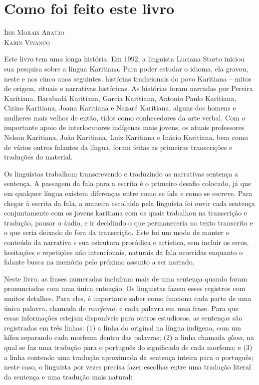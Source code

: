 \chapter{Como foi feito este livro}

\begin{flushright}
\textsc{Íris Morais Araújo}\\
\textsc{Karin Vivanco}
\end{flushright}

\noindent{}Este livro tem uma longa história. Em 1992, a linguista Luciana Storto
iniciou sua pesquisa sobre a língua Karitiana. Para poder estudar o
idioma, ela gravou, neste e nos cinco anos seguintes, histórias
tradicionais do povo Karitiana -- mitos de origem, rituais e narrativas
históricas. As histórias foram narradas por Pereira Karitiana, Barabadá
Karitiana, Garcia Karitiana, Antonio Paulo Karitiana, Cizino Karitiana,
Joana Karitiana e Nazaré Karitiana, alguns dos homens e mulheres mais
velhos de então, tidos como conhecedores da arte verbal. Com o
importante apoio de interlocutores indígenas mais jovens, os atuais
professores Nelson Karitiana, João Karitiana, Luiz Karitiana e Inácio
Karitiana, bem como de vários outros falantes da língua, foram feitas as
primeiras transcrições e traduções do material.

Os linguistas trabalham transcrevendo e traduzindo as narrativas
sentença a sentença. A passagem da fala para a escrita é o primeiro
desafio colocado, já que em qualquer língua existem diferenças entre
como se fala e como se escreve. Para chegar à escrita da fala, a maneira
escolhida pela linguista foi ouvir cada sentença conjuntamente com os
jovens karitiana com os quais trabalhou na transcrição e tradução,
pausar o áudio, e ir decidindo o que permaneceria no texto transcrito e
o que seria deixado de fora da transcrição. Este foi um modo de manter o
conteúdo da narrativa e sua estrutura prosódica e artística, sem incluir
os erros, hesitações e repetições não intencionais, naturais da fala
ocorridas enquanto o falante busca na memória pelo próximo assunto a ser
narrado.

Neste livro, as frases numeradas incluíram mais de uma sentença quando
foram pronunciadas com uma única entoação. Os linguistas fazem esses
registros com muitos detalhes. Para eles, é importante saber como
funciona cada parte de uma única palavra, chamada de \emph{morfema,} e
cada palavra em uma frase. Para que essas informações estejam
disponíveis para outros estudiosos, as sentenças são registradas em três
linhas: (1) a linha do original na língua indígena, com um hífen
separando cada morfema dentro das palavras; (2) a linha chamada
\emph{glosa}, na qual se faz uma tradução para o português do
significado de cada morfema; e (3) a linha contendo uma tradução
aproximada da sentença inteira para o português; neste caso, o linguista
por vezes precisa fazer escolhas entre uma tradução literal da sentença
e uma tradução mais natural:

